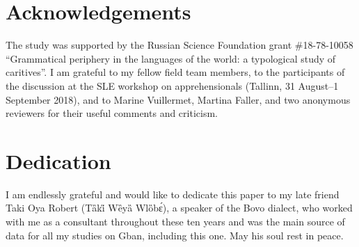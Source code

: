 \documentclass[output=paper,colorlinks,citecolor=brown]{langscibook}
\begin{document}
\section*{Acknowledgements}

The study was supported by the Russian Science Foundation grant \#18-78-10058 ``Grammatical periphery in the languages of the world: a typological study of caritives''. I am grateful to my fellow field team members, to the participants of the discussion at the SLE workshop on apprehensionals (Tallinn, 31 August--1 September 2018), and to Marine Vuillermet, Martina Faller, and two anonymous reviewers for their useful comments and criticism.

\section*{Dedication}

I am endlessly grateful and would like to dedicate this paper to my late friend Taki Oya Robert (Tȁki̋ Wȅyȁ Wlȍbɛ́), a speaker of the Bovo dialect, who worked with me as a consultant throughout these ten years and was the main source of data for all my studies on Gban, including this one. May his soul rest in peace.


\printbibliography[heading=subbibliography,notkeyword=this]
\end{document}
